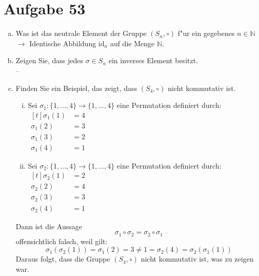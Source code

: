 \section{Aufgabe 53}

\begin{enumerate}[(a)]
    \item Was ist das neutrale Element der Gruppe $(S_n, \circ)$ f"ur ein gegebenes $n \in \mathbb{N}$ \\[5pt]
        $\rightarrow$ Identische Abbildung $\text{id}_n$ auf die Menge $\mathbb{N}$.
    \item Zeigen Sie, dass jedes $\sigma \in S_n$ ein inverses Element besitzt. \\[5pt]
        --
    \item Finden Sie ein Beispiel, das zeigt, dass $(S_4, \circ)$ nicht
        kommutativ ist.
        \begin{enumerate}[i)]
            \item Sei $\sigma_1: \{1,...,4\} \rightarrow \{1,...,4\}$ eine Permutation definiert durch: \\[5pt]
                $\begin{aligned}[t]
                    \sigma_1(1) &= 4 \\
                    \sigma_1(2) &= 3 \\
                    \sigma_1(3) &= 2 \\
                    \sigma_1(4) &= 1
                 \end{aligned}$
            \item Sei $\sigma_2: \{1,...,4\} \rightarrow \{1,...,4\}$ eine Permutation definiert durch: \\[5pt]
                $\begin{aligned}[t]
                    \sigma_2(1) &= 2 \\
                    \sigma_2(2) &= 4 \\
                    \sigma_2(3) &= 3 \\
                    \sigma_2(4) &= 1
                 \end{aligned}$
        \end{enumerate}
        Dann ist die Aussage
        \begin{equation*}
            \sigma_1 \circ \sigma_2 = \sigma_2 \circ \sigma_1
        \end{equation*}
        offensichtlich falsch, weil gilt:
        \begin{equation*}
            \sigma_1(\sigma_2(1)) = \sigma_1(2) = 3 \neq 1 = \sigma_2(4) = \sigma_2(\sigma_1(1))
        \end{equation*}
        Daraus folgt, dass die Gruppe $(S_4, \circ)$ nicht
        kommutativ ist, was zu zeigen war.
\end{enumerate}
